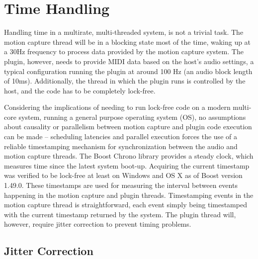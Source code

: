 \section{Time Handling}

Handling time in a multirate, multi-threaded system,
is not a trivial task.
The motion capture thread will be in
a blocking state most of the time,
waking up at a 30Hz frequency to process data
provided by the motion capture system.
The plugin, however, needs to provide MIDI data
based on the host's audio settings,
a typical configuration running the
plugin at around 100 Hz (an audio block length of 10ms).
Additionally, the thread in which the plugin runs
is controlled by the host,
and the code has to be completely lock-free.

Considering the implications of needing to run lock-free code on
a modern multi-core system, running a general purpose
operating system (OS),
no assumptions about causality or parallelism between
motion capture and plugin code execution can be made --
scheduling latencies and parallel execution forces the use
of a reliable timestamping mechanism for synchronization between
the audio and motion capture threads.
The Boost Chrono library provides a steady clock,
which measures time since the latest system boot-up.
Acquiring the current timestamp was verified to be lock-free
at least on Windows and OS X as of Boost version 1.49.0.
These timestamps are used for measuring the interval between
events happening in the motion capture and plugin threads.
Timestamping events in the motion capture thread is straightforward,
each event simply being timestamped with
the current timestamp returned by the system.
The plugin thread will, however,
require jitter correction to prevent timing problems.

\subsection{Jitter Correction}

